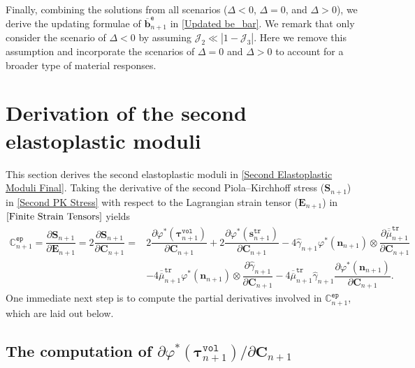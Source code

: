 \documentclass[preprint,11pt]{elsarticle}
\theoremstyle{definition}
\begin{document}
Finally, combining the solutions from all scenarios ($\Delta < 0$, $\Delta = 0$, and $\Delta > 0$), we derive the updating formulae of $\overline{\mathbf{b}}_{n+1}^\texttt{e}$ in \eqref{Updated be_bar}. We remark that \citet{simo_associative_1992} only consider the scenario of $\Delta < 0$ by assuming $\mathcal{J}_2 \ll |1-\mathcal{J}_3|$. Here we remove this assumption and incorporate the scenarios of $\Delta = 0$ and $\Delta > 0$ to account for a broader type of material responses.


\section{Derivation of the second elastoplastic moduli}
\label{Sec: Second Elastoplastic Moduli}

This section derives the second elastoplastic moduli in \eqref{Second Elastoplastic Moduli Final}. Taking the derivative of the second Piola--Kirchhoff stress ($\mathbf{S}_{n+1}$) in \eqref{Second PK Stress} with respect to the Lagrangian strain tensor ($\mathbf{E}_{n+1}$) in $\eqref{Finite Strain Tensors}$ yields
\begin{equation} \label{Second Elastoplastic Moduli Initial}
    \begin{array}{ll}
        \mathbb{C}_{n+1}^\texttt{ep}
        = \dfrac{\partial \mathbf{S}_{n+1}}{\partial \mathbf{E}_{n+1}}
        = 2 \dfrac{\partial \mathbf{S}_{n+1}}{\partial \mathbf{C}_{n+1}}
        = & 2 \dfrac{\partial \varphi^*(\boldsymbol{\tau}_{n+1}^\texttt{vol})}{\partial \mathbf{C}_{n+1}}
        + 2 \dfrac{\partial \varphi^*(\mathbf{s}_{n+1}^\texttt{tr})}{\partial \mathbf{C}_{n+1}}
        - 4 \widehat{\gamma}_{n+1} \varphi^*(\mathbf{n}_{n+1}) \otimes \dfrac{\partial \overline{\overline{\mu}}_{n+1}^\texttt{tr}}{\partial \mathbf{C}_{n+1}} \\[12pt]

        &- 4 \overline{\overline{\mu}}_{n+1}^\texttt{tr} \varphi^* (\mathbf{n}_{n+1}) \otimes \dfrac{\partial \widehat{\gamma}_{n+1}}{\partial \mathbf{C}_{n+1}}
        - 4 \overline{\overline{\mu}}_{n+1}^\texttt{tr} \widehat{\gamma}_{n+1} \dfrac{\partial \varphi^*(\mathbf{n}_{n+1})}{\partial \mathbf{C}_{n+1}}.
    \end{array}
\end{equation}
One immediate next step is to compute the partial derivatives involved in $\mathbb{C}_{n+1}^\texttt{ep}$, which are laid out below.

\subsection[]{The computation of $\partial \varphi^*(\boldsymbol{\tau}_{n+1}^\texttt{vol}) / \partial \mathbf{C}_{n+1}$}
\end{document}
